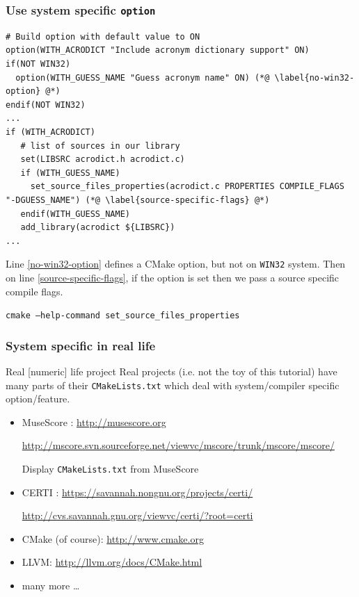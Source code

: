 \documentclass[compress,slidestop,table
              ]
               {beamer}
\newcommand{\fname}[1]{\texttt{#1}}
\begin{document}
\begin{frame}[fragile]
\frametitle{Use system specific \lstinline!option!}
\begin{lstlisting}[basicstyle=\tiny]
# Build option with default value to ON
option(WITH_ACRODICT "Include acronym dictionary support" ON)
if(NOT WIN32)
  option(WITH_GUESS_NAME "Guess acronym name" ON) (*@ \label{no-win32-option} @*)
endif(NOT WIN32)
...
if (WITH_ACRODICT)
   # list of sources in our library
   set(LIBSRC acrodict.h acrodict.c)
   if (WITH_GUESS_NAME)
     set_source_files_properties(acrodict.c PROPERTIES COMPILE_FLAGS "-DGUESS_NAME") (*@ \label{source-specific-flags} @*)
   endif(WITH_GUESS_NAME)
   add_library(acrodict ${LIBSRC})
...
\end{lstlisting}
Line \ref{no-win32-option} defines a CMake option, but not on \lstinline!WIN32! system.
Then on line \ref{source-specific-flags}, if the option is set then we pass a source specific compile flags.

\texttt{cmake --help-command set\_source\_files\_properties}
\end{frame}

\begin{frame}[fragile]
\frametitle{System specific in real life}
\begin{block}{Real [numeric] life project}
Real projects (i.e. not the toy of this tutorial) have many parts
of their \fname{CMakeLists.txt} which deal with system/compiler
specific option/feature.
\end{block}
\begin{itemize}
\item MuseScore : \url{http://musescore.org}

      {\tiny \url{http://mscore.svn.sourceforge.net/viewvc/mscore/trunk/mscore/mscore/}}

      \alert{Display \fname{CMakeLists.txt} from MuseScore}
\item CERTI : \url{https://savannah.nongnu.org/projects/certi/}

      {\tiny \url{http://cvs.savannah.gnu.org/viewvc/certi/?root=certi}}
\item CMake (of course): \url{http://www.cmake.org}
\item LLVM: \url{http://llvm.org/docs/CMake.html}
\item many more \ldots
\end{itemize}
\end{frame}
\end{document}
